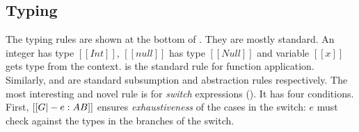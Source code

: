 \subsection{Typing}\label{sec:union:typ}
The typing rules are shown at the bottom of .
They are mostly standard. An integer has type $[[Int]]$,
$[[null]]$ has type $[[Null]]$ and variable $[[x]]$ gets type from the
context.  is the standard rule for
function application. Similarly,  and 
are standard subsumption and abstraction rules respectively.
The most interesting and novel rule is for \emph{switch} expressions
(). It has four conditions.
First, $[[G |- e : A \/ B]]$ ensures
\emph{exhaustiveness} of the cases in the switch: $e$ must
check against the types in the branches of the switch.
